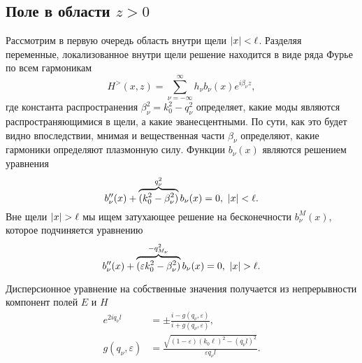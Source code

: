 \subsection{Поле в области $z>0$}
Рассмотрим в первую очередь область внутри щели $\lvert x\rvert<\ell$. Разделяя переменные, локализованное внутри щели решение 
находится в виде ряда Фурье по всем гармоникам 
\begin{equation}
H^>(x,z) = \sum_{\nu = -\infty}^{\infty} h_\nu b_\nu(x) e^{i \beta_{\nu} z},
  \label{eq:Fourier_series}
\end{equation}
где константа распространения $\beta_\nu^2 =  k_0^2-q_\nu^2 $ определяет, какие моды являются распространяющимися в щели, а какие эванесцентными.
По сути, как это будет видно впоследствии, мнимая и вещественная части $\beta_\nu$ определяют, какие гармоники определяют плазмонную силу. 
Функции $b_\nu(x)$ являются 
решением уравнения 
\begin{equation}
  b''_\nu(x) + \overbrace{(k_{0}^{2}-\beta_\nu^{2})}^{q_{\nu}^{2}}b_\nu(x) = 0, \ \abs{x}<\ell.
\end{equation}
Вне щели $\lvert x\rvert > \ell$ мы ищем затухающее решение на бесконечности $b_\nu^M(x)$, которое подчиняется уравнению
\begin{equation}
  b''_\nu(x) + \overbrace{(\varepsilon k_{0}^{2}-\beta_\nu^{2})}^{-q_{M_\nu}^{2}}b_\nu(x) = 0, \ \lvert x\rvert>\ell.
\end{equation}

Дисперсионное уравнение на собственные значения получается из непрерывности компонент полей $E$ и $H$
\begin{align}
e^{2i q_\nu l} &= \pm \frac{i-g(q_\nu,\varepsilon)}{i+g(q_\nu,\varepsilon)},\label{eq:BoundCond} \\
g(q_\nu,\varepsilon) & = \frac{\sqrt{(1-\varepsilon)(k_0 \ell)^2 - (q_\nu l)^2}}{\varepsilon q_\nu l}.  \nonumber
\end{align}

